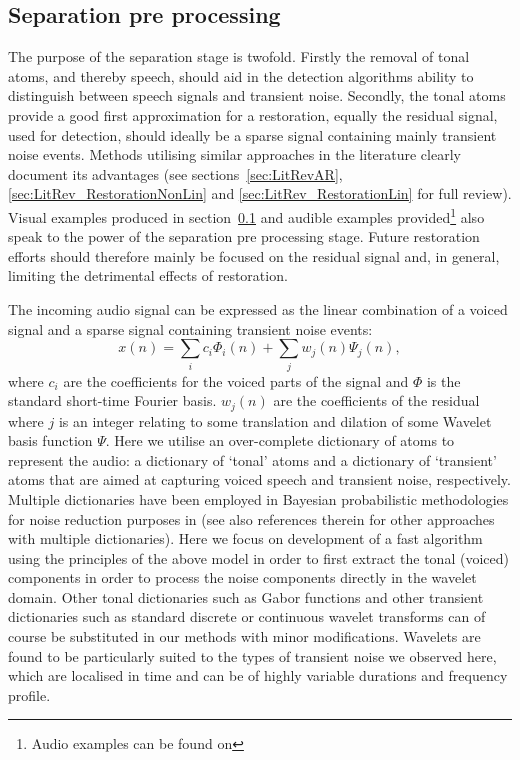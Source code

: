 \subsection{Separation pre processing}\label{sec:WPseparation}
The purpose of the separation stage is twofold. Firstly the removal of tonal atoms, and thereby speech, should aid in the detection algorithms ability to distinguish between speech signals and transient noise. Secondly, the tonal atoms provide a good first approximation for a restoration, equally the residual signal, used for detection, should ideally be a sparse signal containing mainly transient noise events. Methods utilising similar approaches in the literature clearly document its advantages \cite{Godsill1998book} (see sections~\ref{sec:LitRevAR}, \ref{sec:LitRev_RestorationNonLin} and \ref{sec:LitRev_RestorationLin} for full review). Visual examples produced in section~\ref{sec:WPseparation} and audible examples provided\footnote{Audio examples can be found on \siteURL} also speak to the power of the separation pre processing stage.
Future restoration efforts should therefore mainly be focused on the residual signal and, in general, limiting the detrimental effects of restoration.

The incoming audio signal can be expressed as the linear combination of a voiced signal and a sparse signal containing transient noise events:
\begin{equation}\label{eq:modelgeneral}
    x(n) = \sum_i c_i \Phi_i(n) + \sum_{j} w_{j}(n) \Psi_{j}(n),
\end{equation}
where $c_i$ are the coefficients for the voiced parts of the signal and $\Phi$ is the standard short-time Fourier basis. $w_{j}(n)$ are the coefficients of the residual where $j$ is an integer relating to some translation and dilation of some Wavelet basis function $\Psi$. Here we utilise an over-complete dictionary of atoms to represent the audio: a dictionary of `tonal' atoms and a dictionary of `transient' atoms that are aimed at capturing voiced speech and transient noise, respectively. Multiple dictionaries have been employed in Bayesian probabilistic methodologies for noise reduction purposes in \cite{Fevotte2006}\cite{Fevotte2008} (see also references therein for other approaches with multiple dictionaries). Here we focus on development of a fast algorithm using the principles of the above model in order to first extract the tonal (voiced) components in order to process the noise components directly in the wavelet domain. Other tonal dictionaries such as Gabor functions and other transient dictionaries such as standard discrete or continuous wavelet transforms can of course be substituted in our methods with minor modifications. Wavelets are found to be particularly suited to the types of transient noise we observed here, which are localised in time and can be of highly variable durations and frequency profile.

